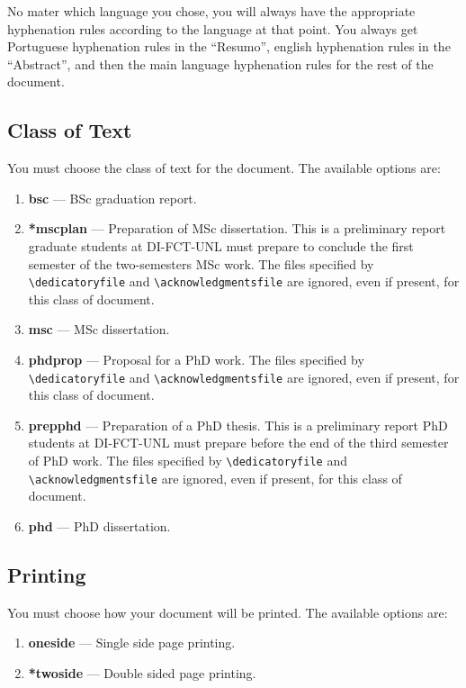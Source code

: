 No mater which language you chose, you will always have the appropriate hyphenation rules according to the language at that point. You always get Portuguese hyphenation rules in the ``Resumo'', english hyphenation rules in the ``Abstract'', and then the main language hyphenation rules for the rest of the document.




\subsection{Class of Text} %
\label{sub:class_of_text}

You must choose the class of text for the document. The available options are:

\begin{enumerate}
	\item \textbf{bsc} --- BSc graduation report.
	\item \textbf{*mscplan} --- Preparation of MSc dissertation. This is a preliminary report graduate students at DI-FCT-UNL must prepare to conclude the first semester of the two-semesters MSc work. The files specified by \verb!\dedicatoryfile! and \verb!\acknowledgmentsfile! are ignored, even if present, for this class of document.
	\item \textbf{msc} --- MSc dissertation.
	\item \textbf{phdprop} ---  Proposal for a PhD work. The files specified by \verb!\dedicatoryfile! and \verb!\acknowledgmentsfile! are ignored, even if present, for this class of document.
	\item \textbf{prepphd} ---  Preparation of a PhD thesis. This is a preliminary report PhD students at DI-FCT-UNL must prepare before the end of the third semester of PhD work. The files specified by \verb!\dedicatoryfile! and \verb!\acknowledgmentsfile! are ignored, even if present, for this class of document.
	\item \textbf{phd} --- PhD dissertation.
\end{enumerate}

\subsection{Printing} %
\label{sub:printing}

You must choose how your document will be printed. The available options are:
\begin{enumerate}
	\item \textbf{oneside} --- Single side page printing.
	\item \textbf{*twoside} --- Double sided page printing.
\end{enumerate}

